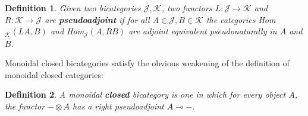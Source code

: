 \documentclass{article}
\newtheorem{defn}{Definition}
\newcommand{\maps}{\colon}
\newcommand{\lhom}{\multimap}
\newcommand{\tensor}{\otimes}
\begin{document}
\begin{defn}
  Given two bicategories $\mathcal{J}, \mathcal{K}$, two functors 
${L\maps\mathcal{J}\to \mathcal{K}}$ and ${R\maps\mathcal{K} \to \mathcal{J}}$ are
{\bf pseudoadjoint} if for all $A \in \mathcal{J}, B \in \mathcal{K}$
the categories Hom${}_\mathcal{K}(LA, B)$ and Hom${}_\mathcal{J}(A, RB)$
are adjoint equivalent pseudonaturally in $A$ and $B$.
\end{defn}

Monoidal closed bicategories satisfy the obvious weakening of the definition of monoidal closed categories:
\begin{defn}
  A monoidal {\bf closed} bicategory is one in which for every object
$A$, the functor $- \tensor A$ has a right pseudoadjoint $A \lhom -.$
\end{defn}
\end{document}
